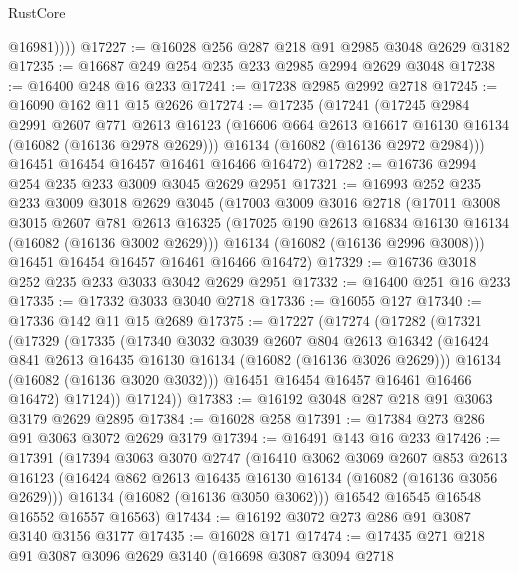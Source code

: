 \begin{lexlean}{RustCore}
\begin{coremodule}
            @16981))))
@17227 := @16028 @256 @287 @218 @91 @2985 @3048 @2629 @3182
@17235 := @16687 @249 @254 @235 @233 @2985 @2994 @2629 @3048
@17238 := @16400 @248 @16 @233
@17241 := @17238 @2985 @2992 @2718
@17245 := @16090 @162 @11 @15 @2626
@17274 := @17235
    (@17241
      (@17245
        @2984
        @2991
        @2607
        @771
        @2613
        @16123
        (@16606 @664 @2613 @16617 @16130 @16134 (@16082 (@16136 @2978 @2629)))
        @16134
        (@16082 (@16136 @2972 @2984)))
      @16451
      @16454
      @16457
      @16461
      @16466
      @16472)
@17282 := @16736 @2994 @254 @235 @233 @3009 @3045 @2629 @2951
@17321 := @16993
    @252
    @235
    @233
    @3009
    @3018
    @2629
    @3045
    (@17003
      @3009
      @3016
      @2718
      (@17011
        @3008
        @3015
        @2607
        @781
        @2613
        @16325
        (@17025 @190 @2613 @16834 @16130 @16134 (@16082 (@16136 @3002 @2629)))
        @16134
        (@16082 (@16136 @2996 @3008)))
      @16451
      @16454
      @16457
      @16461
      @16466
      @16472)
@17329 := @16736 @3018 @252 @235 @233 @3033 @3042 @2629 @2951
@17332 := @16400 @251 @16 @233
@17335 := @17332 @3033 @3040 @2718
@17336 := @16055 @127
@17340 := @17336 @142 @11 @15 @2689
@17375 := @17227
    (@17274
      (@17282
        (@17321
          (@17329
            (@17335
              (@17340
                @3032
                @3039
                @2607
                @804
                @2613
                @16342
                (@16424 @841 @2613 @16435 @16130 @16134 (@16082 (@16136 @3026 @2629)))
                @16134
                (@16082 (@16136 @3020 @3032)))
              @16451
              @16454
              @16457
              @16461
              @16466
              @16472)
            @17124))
        @17124))
@17383 := @16192 @3048 @287 @218 @91 @3063 @3179 @2629 @2895
@17384 := @16028 @258
@17391 := @17384 @273 @286 @91 @3063 @3072 @2629 @3179
@17394 := @16491 @143 @16 @233
@17426 := @17391
    (@17394
      @3063
      @3070
      @2747
      (@16410
        @3062
        @3069
        @2607
        @853
        @2613
        @16123
        (@16424 @862 @2613 @16435 @16130 @16134 (@16082 (@16136 @3056 @2629)))
        @16134
        (@16082 (@16136 @3050 @3062)))
      @16542
      @16545
      @16548
      @16552
      @16557
      @16563)
@17434 := @16192 @3072 @273 @286 @91 @3087 @3140 @3156 @3177
@17435 := @16028 @171
@17474 := @17435
    @271
    @218
    @91
    @3087
    @3096
    @2629
    @3140
    (@16698
      @3087
      @3094
      @2718

\end{coremodule}
\end{lexlean}
